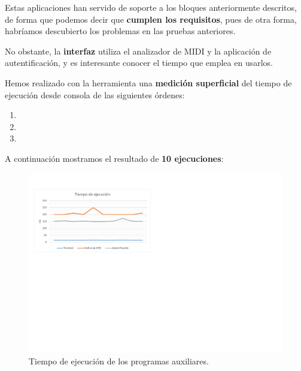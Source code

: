 Estas aplicaciones han servido de soporte a los bloques anteriormente descritos, de forma que podemos decir que \textbf{cumplen los requisitos}, pues de otra forma, habríamos descubierto los problemas en las pruebas anteriores.

No obstante, la \textbf{interfaz} utiliza el analizador de \acrshort{MIDI} y la aplicación de autentificación, y es interesante conocer el tiempo que emplea en usarlos.

Hemos realizado con la herramienta  una \textbf{medición superficial} del tiempo de ejecución desde consola de las siguientes órdenes:

\begin{enumerate}
	\item {}
	\item {}
	\item {}
\end{enumerate}

A continuación mostramos el resultado de \textbf{10 ejecuciones}:

\smallskip

\begin{figure}[H]
	\noindent \begin{centering}
		\includegraphics[width=\linewidth*3/4]{capitulo6/ejecucion}
		\par\end{centering}
	\smallskip
	\caption{\label{fig:ejecucion} Tiempo de ejecución de los programas auxiliares.}
\end{figure}

\smallskip

